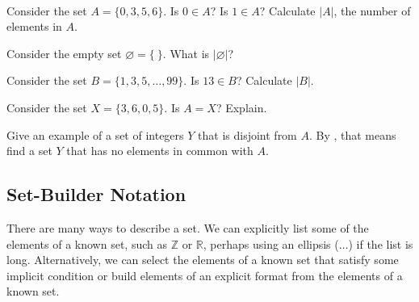\begin{act}
\label{act_set_elements}
~
    \begin{actpart}
        \item Consider the set $A = \{0,3,5,6\}$.  Is $0 \in A$?  Is $1 \in A$?  Calculate $|A|$, the number of elements in $A$.
        \item Consider the empty set $\varnothing=\{ ~\}$. What is $|\varnothing|$?
        \item Consider the set $B = \{1, 3, 5, \ldots, 99\}$. Is $13 \in B$?  Calculate $|B|$.
        \item Consider the set $X=\{3,6,0,5\}$.  Is $A=X$?  Explain.
        \item Give an example of a set of integers $Y$ that is disjoint from $A$.  By , that means find a set $Y$ that has no elements in common with $A$.
    \end{actpart}
\end{act}


\newcommand{\subsetbuild}{Set-Builder Notation}
\subsection{\subsetbuild}
\label{sub_setbuild}

There are many ways to describe a set.  We can explicitly list some of the elements of a known set, such as $\mathbb{Z}$ or $\mathbb{R}$, perhaps using an ellipsis ($\ldots$) if the list is long.  Alternatively, we can select the elements of a known set that satisfy some implicit condition or build elements of an explicit format from the elements of a known set. 

